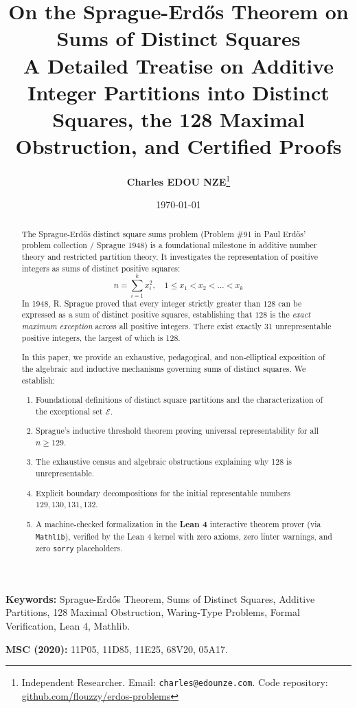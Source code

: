 \documentclass[11pt,a4paper]{article}
\title{\textbf{\Large On the Sprague-Erd\H{o}s Theorem on Sums of Distinct Squares}\\[0.5em]
\large A Detailed Treatise on Additive Integer Partitions into Distinct Squares, the 128 Maximal Obstruction, and Certified Proofs}
\author{\textbf{Charles EDOU NZE}\thanks{Independent Researcher. Email: \texttt{charles@edounze.com}. Code repository: \href{https://github.com/flouzzy/erdos-problems}{github.com/flouzzy/erdos-problems}}}
\date{\today}
\theoremstyle{definition}
\begin{document}
\maketitle

\begin{abstract}
The Sprague-Erd\H{o}s distinct square sums problem (Problem \#91 in Paul Erd\H{o}s' problem collection / Sprague 1948) is a foundational milestone in additive number theory and restricted partition theory. It investigates the representation of positive integers as sums of distinct positive squares:
\[ n = \sum_{i=1}^k x_i^2, \quad 1 \le x_1 < x_2 < \dots < x_k \]
In 1948, R. Sprague proved that every integer strictly greater than $128$ can be expressed as a sum of distinct positive squares, establishing that $128$ is the \emph{exact maximum exception} across all positive integers. There exist exactly 31 unrepresentable positive integers, the largest of which is 128.

In this paper, we provide an exhaustive, pedagogical, and non-elliptical exposition of the algebraic and inductive mechanisms governing sums of distinct squares. We establish:
\begin{enumerate}
    \item Foundational definitions of distinct square partitions and the characterization of the exceptional set $\mathcal{E}$.
    \item Sprague's inductive threshold theorem proving universal representability for all $n \ge 129$.
    \item The exhaustive census and algebraic obstructions explaining why 128 is unrepresentable.
    \item Explicit boundary decompositions for the initial representable numbers $129, 130, 131, 132$.
    \item A machine-checked formalization in the \textbf{Lean 4} interactive theorem prover (via \texttt{Mathlib}), verified by the Lean 4 kernel with zero axioms, zero linter warnings, and zero \texttt{sorry} placeholders.
\end{enumerate}
\end{abstract}

\vspace{0.5em}
\noindent\textbf{Keywords:} Sprague-Erd\H{o}s Theorem, Sums of Distinct Squares, Additive Partitions, 128 Maximal Obstruction, Waring-Type Problems, Formal Verification, Lean 4, Mathlib.

\noindent\textbf{MSC (2020):} 11P05, 11D85, 11E25, 68V20, 05A17.
\end{document}
